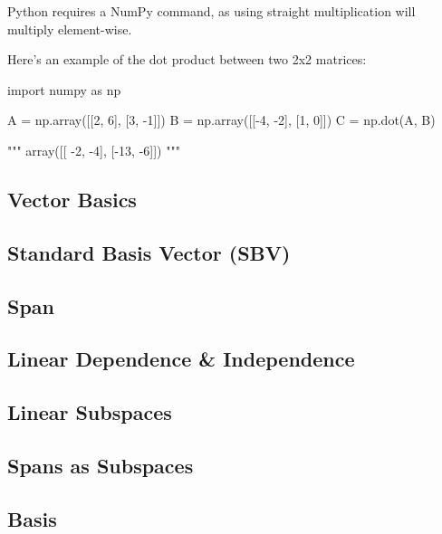 Python requires a NumPy command, as using straight multiplication will multiply element-wise.

Here's an example of the dot product between two 2x2 matrices:
\begin{python}
	import numpy as np
	
	A = np.array([[2, 6], [3, -1]])
	B = np.array([[-4, -2], [1, 0]])
	C = np.dot(A, B)
	
	"""
	array([[ -2,  -4],
		   [-13,  -6]])
	"""
\end{python}



\subsection{Vector Basics}\label{concept1.4}

\subsection{Standard Basis Vector (SBV)}\label{concept1.5}

\subsection{Span}\label{concept1.6}

\subsection{Linear Dependence \& Independence}\label{concept1.7}

\subsection{Linear Subspaces}\label{concept1.8}

\subsection{Spans as Subspaces}\label{concept1.9}

\subsection{Basis}\label{concept1.10}

